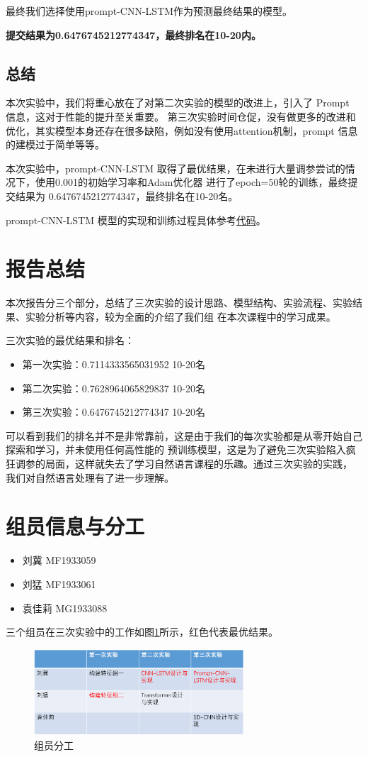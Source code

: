 \documentclass[UTF8]{article}
\begin{document}
最终我们选择使用prompt-CNN-LSTM作为预测最终结果的模型。

\textbf{提交结果为0.6476745212774347，最终排名在10-20内。}

\subsection{总结}

本次实验中，我们将重心放在了对第二次实验的模型的改进上，引入了 Prompt 信息，这对于性能的提升至关重要。
第三次实验时间仓促，没有做更多的改进和优化，其实模型本身还存在很多缺陷，例如没有使用attention机制，prompt
信息的建模过于简单等等。

本次实验中，prompt-CNN-LSTM 取得了最优结果，在未进行大量调参尝试的情况下，使用0.001的初始学习率和Adam优化器
进行了epoch=50轮的训练，最终提交结果为 0.6476745212774347，最终排名在10-20名。

prompt-CNN-LSTM 模型的实现和训练过程具体参考\href{https://github.com/Mandule/EssayAE/tree/master/HW3}{代码}。

\section{报告总结}

本次报告分三个部分，总结了三次实验的设计思路、模型结构、实验流程、实验结果、实验分析等内容，较为全面的介绍了我们组
在本次课程中的学习成果。

三次实验的最优结果和排名：
\begin{itemize}
    \item 第一次实验：0.7114333565031952    10-20名
    \item 第二次实验：0.7628964065829837    10-20名
    \item 第三次实验：0.6476745212774347    10-20名
\end{itemize}

可以看到我们的排名并不是非常靠前，这是由于我们的每次实验都是从零开始自己探索和学习，并未使用任何高性能的
预训练模型，这是为了避免三次实验陷入疯狂调参的局面，这样就失去了学习自然语言课程的乐趣。通过三次实验的实践，
我们对自然语言处理有了进一步理解。

\section{组员信息与分工}

\begin{itemize}
    \item 刘冀  MF1933059
    \item 刘猛  MF1933061
    \item 袁佳莉    MG1933088
\end{itemize}

三个组员在三次实验中的工作如图\ref{fig:分工}所示，红色代表最优结果。

\begin{figure}[h]
    \centering
    \includegraphics[width=0.7\textwidth]{fig/6.png}
    \caption{组员分工}
    \label{fig:分工}
\end{figure}
\end{document}
